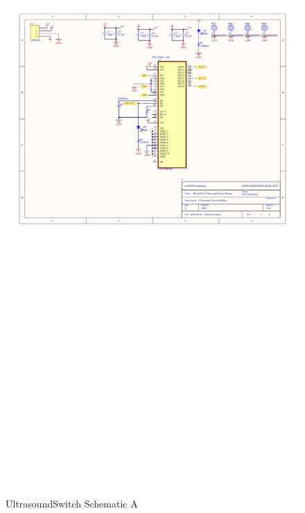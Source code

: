 \begin{landscape}
\begin{figure}[htbp]
		\includegraphics[width=20cm,height=28.7cm,keepaspectratio]{Figures/appendix/ultrasound_switch.pdf}
		\caption{UltrasoundSwitch Schematic A}
		\label{fig:appendix_ultrasoundswitch_a}
	\end{figure}
\end{landscape}
